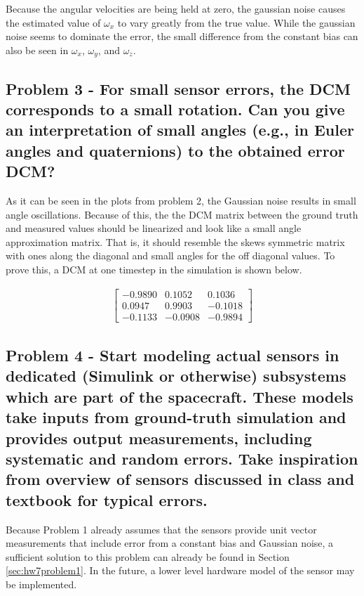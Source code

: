 Because the angular velocities are being held at zero, the gaussian noise causes the estimated value of $\omega_x$ to vary greatly from the true value. While the gaussian noise seems to dominate the error, the small difference from the constant bias can also be seen in $\omega_x$, $\omega_y$, and $\omega_z$.

\subsection{Problem 3 - For small sensor errors, the DCM corresponds to a small rotation. Can you give an interpretation of small angles (e.g., in Euler angles and quaternions) to the obtained error DCM?}

As it can be seen in the plots from problem 2, the Gaussian noise results in small angle oscillations. Because of this, the the DCM matrix between the ground truth and measured values should be linearized and look like a small angle approximation matrix. That is, it should resemble the skews symmetric matrix with ones along the diagonal and small angles for the off diagonal values. To prove this, a DCM at one timestep in the simulation is shown below.

\begin{align*}
\begin{bmatrix}
    -0.9890   &  0.1052  &  0.1036 \\
    0.0947  &  0.9903  & -0.1018 \\
   -0.1133 &  -0.0908 &  -0.9894
\end{bmatrix}
\end{align*}



\subsection{Problem 4 - Start modeling actual sensors in dedicated (Simulink or otherwise) subsystems which are part of the spacecraft. These models take inputs from ground-truth simulation and provides output measurements, including systematic and random errors. Take inspiration from overview of sensors discussed in class and
textbook for typical errors.}

Because Problem 1 already assumes that the sensors provide unit vector measurements that include error from a constant bias and Gaussian noise, a sufficient solution to this problem can already be found in Section \ref{sec:hw7problem1}. In the future, a lower level hardware model of the sensor may be implemented.

